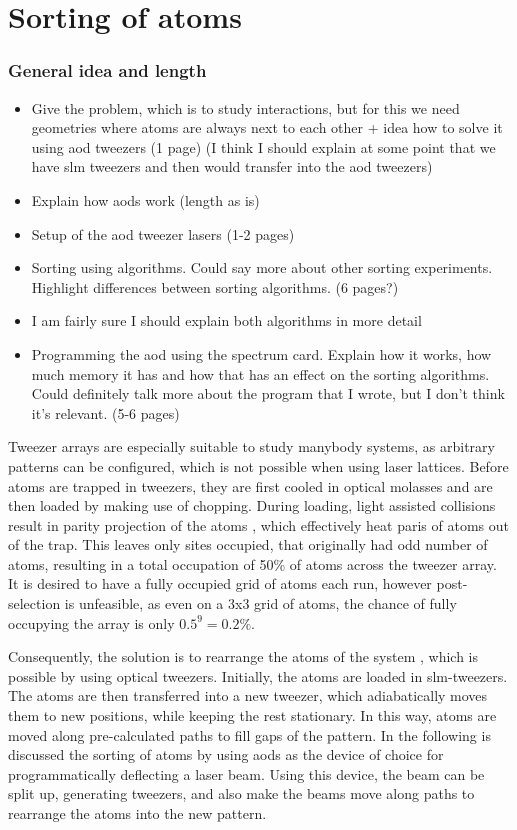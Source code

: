 \chapter{Sorting of atoms}

\subsection*{General idea and length}

\begin{itemize}
	\item Give the problem, which is to study interactions, but for this we need geometries where atoms are always next to each other + idea how to solve it using aod tweezers (1 page) (I think I should explain at some point that we have slm tweezers and then would transfer into the aod tweezers)
	\item Explain how aods work (length as is)
	\item Setup of the aod tweezer lasers (1-2 pages)
	\item Sorting using algorithms. Could say more about other sorting experiments. Highlight differences between sorting algorithms. (6 pages?)
	\item I am fairly sure I should explain both algorithms in more detail
	\item Programming the aod using the spectrum card. Explain how it works, how much memory it has and how that has an effect on the sorting algorithms. Could definitely talk more about the program that I wrote, but I don't think it's relevant. (5-6 pages)
\end{itemize}

Tweezer arrays are especially suitable to study manybody systems, as arbitrary patterns can be configured, which is not possible when using laser lattices. Before atoms are trapped in tweezers, they are first cooled in optical molasses and are then loaded by making use of chopping. During loading, light assisted collisions result in parity projection of the atoms \cite{Cooper2018}, which effectively heat paris of atoms out of the trap. This leaves only sites occupied, that originally had odd number of atoms, resulting in a total occupation of 50\% of atoms across the tweezer array. It is desired to have a fully occupied grid of atoms each run, however post-selection is unfeasible, as even on a 3x3 grid of atoms, the chance of fully occupying the array is only $0.5^9 = 0.2\%$.

Consequently, the solution is to rearrange the atoms of the system \cite{Barredo2016, Endres2016}, which is possible by using optical tweezers. Initially, the atoms are loaded in \ac{slm}-tweezers. The atoms are then transferred into a new tweezer, which adiabatically moves them to new positions, while keeping the rest stationary. In this way, atoms are moved along pre-calculated paths to fill gaps of the pattern. In the following is discussed the sorting of atoms by using \acp{aod} as the device of choice for programmatically deflecting a laser beam. Using this device, the beam can be split up, generating tweezers, and also make the beams move along paths to rearrange the atoms into the new pattern.


